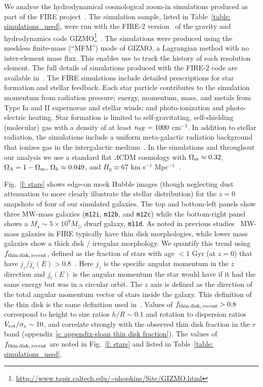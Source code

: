 \documentclass[fleqn,usenatbib]{mnras}
\newcommand{\fthin}{f_{\rm thin\,disk,\,recent}}
\begin{document}
We analyse the hydrodynamical cosmological zoom-in simulations produced as part of the FIRE project~\citep{Hopkins2014}.
The simulation sample, listed in Table~\ref{table: simulations_used}, were run with the FIRE-2 version~\citep{Hopkins2018} of the gravity and hydrodynamics code \textsc{GIZMO}\footnote{\url{http://www.tapir.caltech.edu/\~phopkins/Site/GIZMO.html}}~\citep{Hopkins2015}.
The simulations were produced using the meshless finite-mass (``MFM'') mode of \textsc{GIZMO}, a Lagrangian method with no inter-element mass flux.
This enables use to track the history of each resolution element.
The full details of simulations produced with the FIRE-2 code are available in~\cite{Hopkins2018}.
The FIRE simulations include detailed prescriptions for star formation and stellar feedback.
Each star particle contributes to the simulation momentum from radiation pressure; energy, momentum, mass, and metals from Type Ia and II supernovae and stellar winds; and photo-ionization and photo-electric heating.
Star formation is limited to self-gravitating, self-shielding (molecular) gas with a density of at least $n_{\rm SF} = 1000$ cm$^{-3}$.
In addition to stellar radiation, the simulations include a uniform meta-galactic radiation background that ionizes gas in the intergalactic medium~\citep{Faucher-Giguere2009}.
In the simulations and throughout our analysis we use a standard flat $\Lambda$CDM cosmology with $\Omega_{\rm m }\approx 0.32$, $\Omega_{\Lambda}=1-\Omega_{\rm m}$, $\Omega_{\rm b} \approx 0.049$, and $H_{0} \approx 67$ km s$^{-1}$ Mpc$^{-1}$~\citep[e.g.,][]{PlanckCollaboration2018}.

Fig.~\ref{f: stars} shows edge-on mock Hubble images (though neglecting dust attenuation to more clearly illustrate the stellar distribution) for the $z=0$ snapshots of four of our simulated galaxies.
The top and bottom-left panels show three MW-mass galaxies (\texttt{m12i}, \texttt{m12b}, and \texttt{m12c}) while the bottom-right panel shows a $M_\star \sim 5 \times 10^9 M_\odot$ dwarf galaxy, \texttt{m11d}.
As noted in previous studies~\citep{Garrison-Kimmel2018, El-Badry2018} MW-mass galaxies in FIRE typically have thin disk morphologies, while lower mass galaxies show a thick disk / irregular morphology.
We quantify this trend using $\fthin$, defined as the fraction of stars with age $<1$ Gyr (at $z=0$) that have $j_z/j_c(E) > 0.8$~\citep[e.g.][]{Yu2021}.
Here $j_z$ is the specific angular momentum in the $z$ direction and $j_c(E)$ is the angular momentum the star would have if it had the same energy but was in a circular orbit.
The $z$ axis is defined as the direction of the total angular momentum vector of stars inside the galaxy.
This definition of the thin disk is the same definition used in~\cite{Yu2021}.
Values of $\fthin>0.8$ correspond to height to size ratios $h/R \sim 0.1$ and rotation to dispersion ratios $V_{\rm rot}/\sigma_z \sim10$, and correlate strongly with the observed thin disk fraction in the $r$ band (appendix \ref{s: appendix-sloan thin disk fraction}).
The values of $\fthin$ are noted in Fig.~\ref{f: stars} and listed in Table~\ref{table: simulations_used}.
\end{document}
